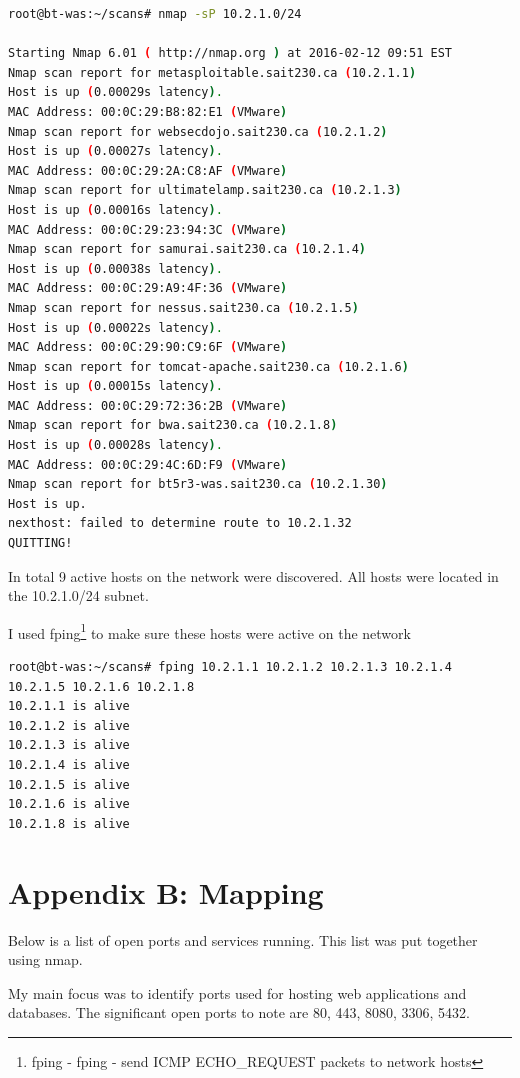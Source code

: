 \documentclass{article}
\begin{document}
\begin{lstlisting}[language=Bash, firstline=1, lastline=1]
root@bt-was:~/scans# nmap -sP 10.2.1.0/24

Starting Nmap 6.01 ( http://nmap.org ) at 2016-02-12 09:51 EST
Nmap scan report for metasploitable.sait230.ca (10.2.1.1)
Host is up (0.00029s latency).
MAC Address: 00:0C:29:B8:82:E1 (VMware)
Nmap scan report for websecdojo.sait230.ca (10.2.1.2)
Host is up (0.00027s latency).
MAC Address: 00:0C:29:2A:C8:AF (VMware)
Nmap scan report for ultimatelamp.sait230.ca (10.2.1.3)
Host is up (0.00016s latency).
MAC Address: 00:0C:29:23:94:3C (VMware)
Nmap scan report for samurai.sait230.ca (10.2.1.4)
Host is up (0.00038s latency).
MAC Address: 00:0C:29:A9:4F:36 (VMware)
Nmap scan report for nessus.sait230.ca (10.2.1.5)
Host is up (0.00022s latency).
MAC Address: 00:0C:29:90:C9:6F (VMware)
Nmap scan report for tomcat-apache.sait230.ca (10.2.1.6)
Host is up (0.00015s latency).
MAC Address: 00:0C:29:72:36:2B (VMware)
Nmap scan report for bwa.sait230.ca (10.2.1.8)
Host is up (0.00028s latency).
MAC Address: 00:0C:29:4C:6D:F9 (VMware)
Nmap scan report for bt5r3-was.sait230.ca (10.2.1.30)
Host is up.
nexthost: failed to determine route to 10.2.1.32
QUITTING!
\end{lstlisting}

In total 9 active hosts on the network were discovered. All hosts were
located in the 10.2.1.0/24 subnet.

I used fping\footnote{\label{fping}fping - fping - send ICMP ECHO\_REQUEST packets to network hosts} 
to make sure these hosts were active on the network

\begin{lstlisting}
root@bt-was:~/scans# fping 10.2.1.1 10.2.1.2 10.2.1.3 10.2.1.4 10.2.1.5 10.2.1.6 10.2.1.8
10.2.1.1 is alive
10.2.1.2 is alive
10.2.1.3 is alive
10.2.1.4 is alive
10.2.1.5 is alive
10.2.1.6 is alive
10.2.1.8 is alive
\end{lstlisting}


\newpage
\section{Appendix B: Mapping}

Below is a list of open ports and services running. This list was put together using nmap.


My main focus was to identify ports used for hosting web applications and databases. 
The significant open ports to note are 80, 443, 8080, 3306, 5432.
\end{document}
